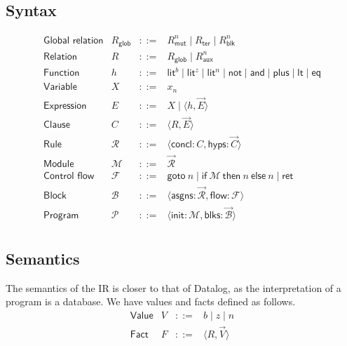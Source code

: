 \documentclass[11pt]{article}
\newcommand{\mcf}{\mathcal{F}}
\newcommand{\mcb}{\mathcal{B}}
\newcommand{\mcp}{\mathcal{P}}
\newcommand{\mcr}{\mathcal{R}}
\newcommand{\mcm}{\mathcal{M}}
\newcommand{\fgoto}[1]{\textsf{goto}~#1}
\newcommand{\fif}[3]{\textsf{if}~#1~\textsf{then}~#2~\textsf{else}~#3}
\newcommand{\fret}{\textsf{ret}}
\newcommand{\mut}{\textsf{mut}}
\newcommand{\blk}{\textsf{blk}}
\newcommand{\ter}{\textsf{ter}}
\newcommand{\glob}{\textsf{glob}}
\newcommand{\aux}{\textsf{aux}}
\newcommand{\flit}{\textsf{lit}}
\newcommand{\fnot}{\textsf{not}}
\newcommand{\fand}{\textsf{and}}
\newcommand{\fplus}{\textsf{plus}}
\newcommand{\flt}{\textsf{lt}}
\newcommand{\feq}{\textsf{eq}}
\newcommand{\asgns}{\textsf{asgns}}
\newcommand{\flow}{\textsf{flow}}
\newcommand{\blks}{\textsf{blks}}
\newcommand{\concl}{\textsf{concl}}
\newcommand{\hyps}{\textsf{hyps}}
\newcommand{\init}{\textsf{init}}
\begin{document}
\subsection{Syntax}
\[
\begin{array}{llcl}
\textsf{Global relation} & R_{\glob{}} & ::= & R_{\mut{}}^n
\mid R_{\ter{}}
\mid R_{\blk{}}^n
\\

\textsf{Relation} & R & ::= & R_{\glob{}}
\mid R_{\aux{}}^n
\\

\textsf{Function} & h & ::= & \flit{}^b
\mid \flit{}^z
\mid \flit{}^n
\mid \fnot
\mid \fand
\mid \fplus
\mid \flt
\mid \feq
\\

\textsf{Variable} & X & ::= & x_n
\\

\textsf{Expression} & E & ::= & X
\mid \langle h, \vec{E} \rangle
\\

\textsf{Clause} & C & ::= & \langle R, \vec{E} \rangle
\\

\textsf{Rule} & \mcr{} & ::= & \langle \concl{}: C, \hyps{}: \vec{C} \rangle
\\

\textsf{Module} & \mcm{} & ::= & \vec{\mcr{}}
\\

\textsf{Control flow} & \mcf{} & ::= & \fgoto{n}
\mid \fif{\mcm{}}{n}{n}
\mid \fret{}
\\

\textsf{Block} & \mcb{} & ::= & \langle \asgns{}: \vec{\mcr{}}, \flow{}: \mcf{} \rangle
\\

\textsf{Program} & \mcp{} & ::= & \langle \init{}: \mcm{}, \blks{}: \vec{\mcb{}} \rangle
\\

\end{array}
\]

\subsection{Semantics}
The semantics of the IR is closer to that of Datalog, as the interpretation of a program is a database.
We have values and facts defined as follows.
\[
\begin{array}{llcl}
\textsf{Value} & V & ::= & b
\mid z
\mid n
\\

\textsf{Fact} & F & ::= & \langle R, \vec{V} \rangle
\end{array}
\]
\end{document}
